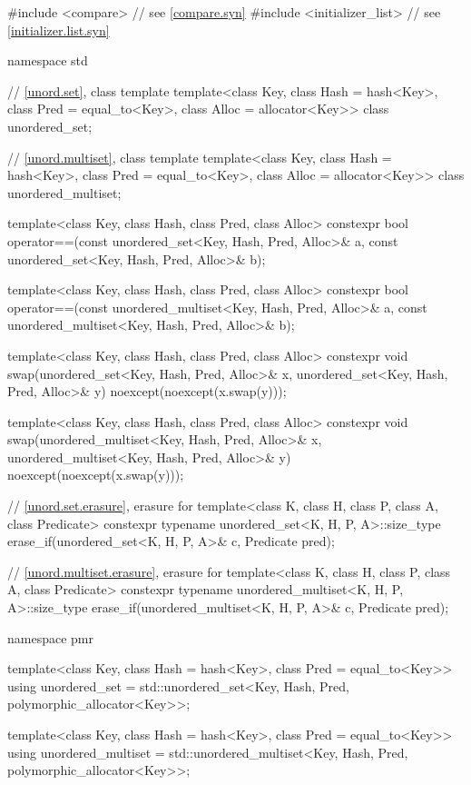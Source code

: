 %
%
%
\begin{codeblock}
#include <compare>              // see \ref{compare.syn}
#include <initializer_list>     // see \ref{initializer.list.syn}

namespace std {
  // \ref{unord.set}, class template 
  template<class Key,
           class Hash = hash<Key>,
           class Pred = equal_to<Key>,
           class Alloc = allocator<Key>>
    class unordered_set;

  // \ref{unord.multiset}, class template 
  template<class Key,
           class Hash = hash<Key>,
           class Pred = equal_to<Key>,
           class Alloc = allocator<Key>>
    class unordered_multiset;

  template<class Key, class Hash, class Pred, class Alloc>
    constexpr bool operator==(const unordered_set<Key, Hash, Pred, Alloc>& a,
                              const unordered_set<Key, Hash, Pred, Alloc>& b);

  template<class Key, class Hash, class Pred, class Alloc>
    constexpr bool operator==(const unordered_multiset<Key, Hash, Pred, Alloc>& a,
                              const unordered_multiset<Key, Hash, Pred, Alloc>& b);

  template<class Key, class Hash, class Pred, class Alloc>
    constexpr void swap(unordered_set<Key, Hash, Pred, Alloc>& x,
                        unordered_set<Key, Hash, Pred, Alloc>& y)
      noexcept(noexcept(x.swap(y)));

  template<class Key, class Hash, class Pred, class Alloc>
    constexpr void swap(unordered_multiset<Key, Hash, Pred, Alloc>& x,
                        unordered_multiset<Key, Hash, Pred, Alloc>& y)
      noexcept(noexcept(x.swap(y)));

  // \ref{unord.set.erasure}, erasure for 
  template<class K, class H, class P, class A, class Predicate>
    constexpr typename unordered_set<K, H, P, A>::size_type
      erase_if(unordered_set<K, H, P, A>& c, Predicate pred);

  // \ref{unord.multiset.erasure}, erasure for 
  template<class K, class H, class P, class A, class Predicate>
    constexpr typename unordered_multiset<K, H, P, A>::size_type
      erase_if(unordered_multiset<K, H, P, A>& c, Predicate pred);

  namespace pmr {
    template<class Key,
             class Hash = hash<Key>,
             class Pred = equal_to<Key>>
      using unordered_set = std::unordered_set<Key, Hash, Pred,
                                               polymorphic_allocator<Key>>;

    template<class Key,
             class Hash = hash<Key>,
             class Pred = equal_to<Key>>
      using unordered_multiset = std::unordered_multiset<Key, Hash, Pred,
                                                         polymorphic_allocator<Key>>;
  }
}
\end{codeblock}


